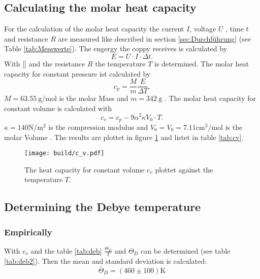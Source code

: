 \subsection{Calculating the molar heat capacity}
For the calculation of the molar heat capacity 
the current $I$, voltage $U$ , time $t$ and resistance $R$ are measured 
like described in section \ref{sec:Durchführung} (see Table \ref{tab:Messwerte}).
\newline \newline
\noindent The engergy the coppy receives is calculated by 
\begin{equation}
    E = U \cdot I \cdot \Delta t .
\end{equation}
\noindent With \eqref{} and the resistance $R$ the temperature $T$ is determined.
The molar heat capacity for constant pressure ist calculated by
\begin{equation}
    c_p = \frac{ M}{m} \frac{E}{\Delta T}.
\end{equation}
\noindent $M = \SI{63.55}{\g\per\mole}$ is the molar Mass and
$m= \SI{342}{\g}$ \cite{Molmasse_kupfer}\cite{V47}.
The molar heat capacity for constant volume is calculated with 
\begin{equation}
    c_v = c_p - 9 \alpha^2 \kappa V_0 \cdot T.
\end{equation}
\noindent $\kappa = 140 \si{\N\per\square\m}$ is the compression modulus \cite{kappa_kupfer}
and $V_0 = V_0 =  7.11 \si{\cubic\cm\per\mole} $ is the molar Volume \cite{V0_kupfer}.
The results are plottet in figure \ref{fig:cv} and listet in table \ref{tab:cv}.

\begin{figure}
    \centering 
    \texttt{[image: build/c\_v.pdf]}
    \caption{The heat capacity for constant volume $c_v$ plottet against the temperature $T$.}
    \label{fig:cv}
\end{figure}

\subsection{Determining the Debye temperature}
\label{sub:deb}
\subsubsection{Empirically}
With $c_v$ and the table \ref{tab:deb}
$\frac{\Theta_D}{T}$ and $\Theta_D$ can be determined (see table \ref{tab:deb2}).
Then the mean and standard deviation is calculated:
\begin{equation*}
    \bar{\Theta}_D =  (460 \pm 100) \si{\kelvin}
\end{equation*}

